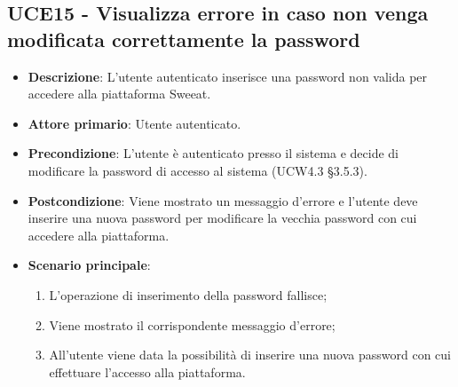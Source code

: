 \subsection{UCE15 - Visualizza errore in caso non venga modificata correttamente la password}
\begin{itemize}
\item \textbf{Descrizione}: L'utente autenticato inserisce una password non valida per accedere alla piattaforma Sweeat.
\item \textbf{Attore primario}: Utente autenticato.
\item \textbf{Precondizione}: L'utente è autenticato presso il sistema e decide di modificare la password di accesso al sistema (UCW4.3 §3.5.3).
\item \textbf{Postcondizione}: Viene mostrato un messaggio d'errore e l'utente deve inserire una nuova password per modificare la vecchia password con cui accedere alla piattaforma.

\item \textbf{Scenario principale}:
\begin{enumerate}
\item L'operazione di inserimento della password fallisce;
\item Viene mostrato il corrispondente messaggio d'errore;
\item All'utente viene data la possibilità di inserire una nuova password con cui effettuare l'accesso alla piattaforma.
\end{enumerate}
\end{itemize}